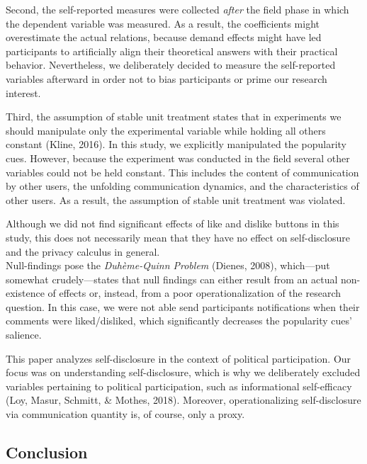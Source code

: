 \documentclass[
  english,
  man,floatsintext]{apa6}
\begin{document}
Second, the self-reported measures were collected \emph{after} the field phase in which the dependent variable was measured.
As a result, the coefficients might overestimate the actual relations, because demand effects might have led participants to artificially align their theoretical answers with their practical behavior.
Nevertheless, we deliberately decided to measure the self-reported variables afterward in order not to bias participants or prime our research interest.

Third, the assumption of stable unit treatment states that in experiments we should manipulate only the experimental variable while holding all others constant (Kline, 2016).
In this study, we explicitly manipulated the popularity cues.
However, because the experiment was conducted in the field several other variables could not be held constant.
This includes the content of communication by other users, the unfolding communication dynamics, and the characteristics of other users.
As a result, the assumption of stable unit treatment was violated.

Although we did not find significant effects of like and dislike buttons in this study, this does not necessarily mean that they have no effect on self-disclosure and the privacy calculus in general.\\
Null-findings pose the \emph{Duhème-Quinn Problem} (Dienes, 2008), which---put somewhat crudely---states that null findings can either result from an actual non-existence of effects or, instead, from a poor operationalization of the research question.
In this case, we were not able send participants notifications when their comments were liked/disliked, which significantly decreases the popularity cues' salience.

This paper analyzes self-disclosure in the context of political participation.
Our focus was on understanding self-disclosure, which is why we deliberately excluded variables pertaining to political participation, such as informational self-efficacy (Loy, Masur, Schmitt, \& Mothes, 2018).
Moreover, operationalizing self-disclosure via communication quantity is, of course, only a proxy.

\hypertarget{conclusion}{%
\subsection{Conclusion}\label{conclusion}}
\end{document}
